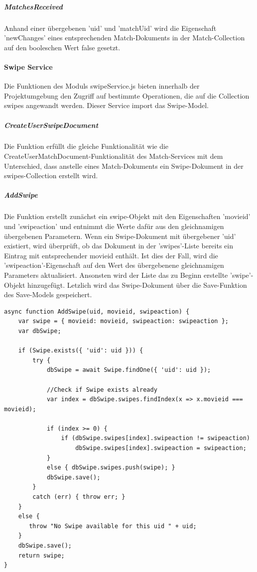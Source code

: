 \subparagraph{MatchesReceived}
Anhand einer übergebenen 'uid' und 'matchUid' wird die Eigenschaft 'newChanges' eines entsprechenden Match-Dokuments in der Match-Collection auf den booleschen Wert false gesetzt. 



%
%

\paragraph{Swipe Service}
Die Funktionen des Moduls swipeService.js bieten innerhalb der Projektumgebung den Zugriff auf bestimmte Operationen, die auf die Collection swipes angewandt werden. Dieser Service import das Swipe-Model.

\subparagraph{CreateUserSwipeDocument}
Die Funktion erfüllt die gleiche Funktionalität wie die CreateUserMatchDocument-Funktionalität des Match-Services mit dem Unterschied, dass anstelle eines Match-Dokuments ein Swipe-Dokument in der swipes-Collection erstellt wird.

\subparagraph{AddSwipe}
Die Funktion erstellt zunächst ein swipe-Objekt mit den Eigenschaften 'movieid' und 'swipeaction' und entnimmt die Werte dafür aus den gleichnamigen übergebenen Parametern. 
Wenn ein Swipe-Dokument mit übergebener 'uid' existiert, wird überprüft, ob das Dokument in der 'swipes'-Liste bereits ein Eintrag mit entsprechender movieid enthält. Ist dies der Fall, wird die 'swipeaction'-Eigenschaft auf den Wert des übergebenene gleichnamigen Parameters aktualisiert. Ansonsten wird der Liste das zu Beginn erstellte 'swipe'-Objekt hinzugefügt. Letzlich wird das Swipe-Dokument über die Save-Funktion des Save-Models gespeichert.

\begin{lstlisting}[caption=Swipe Service - AddSwipe, label=lst:swipeserviceaddswipe]
async function AddSwipe(uid, movieid, swipeaction) {
    var swipe = { movieid: movieid, swipeaction: swipeaction };
    var dbSwipe;

    if (Swipe.exists({ 'uid': uid })) {
        try {
            dbSwipe = await Swipe.findOne({ 'uid': uid });

            //Check if Swipe exists already
            var index = dbSwipe.swipes.findIndex(x => x.movieid === movieid);

            if (index >= 0) {
                if (dbSwipe.swipes[index].swipeaction != swipeaction)
                    dbSwipe.swipes[index].swipeaction = swipeaction;
            }
            else { dbSwipe.swipes.push(swipe); }
            dbSwipe.save();
        }
        catch (err) { throw err; }
    }
    else {
       throw "No Swipe available for this uid " + uid;
    }
    dbSwipe.save();
    return swipe;
}
\end{lstlisting}

